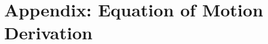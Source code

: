 \documentclass[default,iicol]{sn-jnl}
\begin{document}
\section{Appendix: Equation of Motion Derivation}


\pagestyle{plain}
%
%
\end{document}
